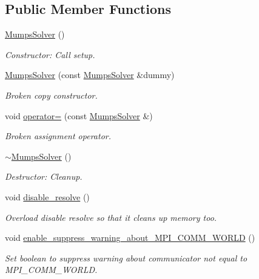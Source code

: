 \subsection*{Public Member Functions}
\begin{DoxyCompactItemize}
\item 
\hyperlink{classoomph_1_1MumpsSolver_ac3f965da46774f48a9b756610f81140e}{Mumps\+Solver} ()
\begin{DoxyCompactList}\small\item\em Constructor\+: Call setup. \end{DoxyCompactList}\item 
\hyperlink{classoomph_1_1MumpsSolver_a0f70542a7e29c3e2dce02a8516e796f6}{Mumps\+Solver} (const \hyperlink{classoomph_1_1MumpsSolver}{Mumps\+Solver} \&dummy)
\begin{DoxyCompactList}\small\item\em Broken copy constructor. \end{DoxyCompactList}\item 
void \hyperlink{classoomph_1_1MumpsSolver_aabd9e13bf639979489557b9af141eb5d}{operator=} (const \hyperlink{classoomph_1_1MumpsSolver}{Mumps\+Solver} \&)
\begin{DoxyCompactList}\small\item\em Broken assignment operator. \end{DoxyCompactList}\item 
\hyperlink{classoomph_1_1MumpsSolver_a20e6116da9911337fb80486bcfaf7eb4}{$\sim$\+Mumps\+Solver} ()
\begin{DoxyCompactList}\small\item\em Destructor\+: Cleanup. \end{DoxyCompactList}\item 
void \hyperlink{classoomph_1_1MumpsSolver_aba2b1c844e190da45c8adbd6dfc0f344}{disable\+\_\+resolve} ()
\begin{DoxyCompactList}\small\item\em Overload disable resolve so that it cleans up memory too. \end{DoxyCompactList}\item 
void \hyperlink{classoomph_1_1MumpsSolver_a0f7ea8c453b2ff106ce42a11c8182cf5}{enable\+\_\+suppress\+\_\+warning\+\_\+about\+\_\+\+M\+P\+I\+\_\+\+C\+O\+M\+M\+\_\+\+W\+O\+R\+LD} ()
\begin{DoxyCompactList}\small\item\em Set boolean to suppress warning about communicator not equal to M\+P\+I\+\_\+\+C\+O\+M\+M\+\_\+\+W\+O\+R\+LD. \end{DoxyCompactList}\item 

\end{DoxyCompactItemize}
